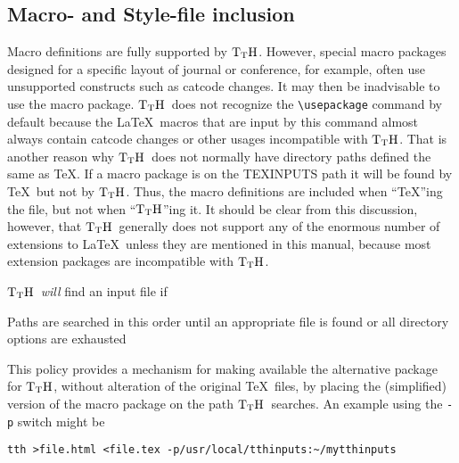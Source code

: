 \documentclass[12pt]{article}
\def\TtH{$\rm{}T_TH$}
\begin{document}
\subsection{Macro- and Style-file 
inclusion }
\label{texins}
Macro definitions are fully supported by \TtH. However, special macro
packages designed for a specific layout of journal or conference, for
example, often use unsupported constructs such as catcode changes. It
may then be inadvisable to use the macro package.  \TtH\ does not
recognize the \verb!\usepackage! command by default because the
\LaTeX\ macros that are input by this command almost always contain
catcode changes or other usages incompatible with \TtH. That is
another reason why \TtH\ does not normally have directory paths
defined the same as \TeX. If a macro package is on the TEXINPUTS path
it will be found by \TeX\ but not by \TtH.  Thus, the macro
definitions are included when ``\TeX''ing the file, but not when
``\TtH''ing it.  It should be clear from this discussion, however,
that \TtH\ generally does not support any of the enormous number of
extensions to \LaTeX\ unless they are mentioned in this manual,
because most extension packages are incompatible with \TtH.

\TtH\ \emph{will} find an input file if 
Paths are searched in this order until an appropriate file is
found or all directory options are exhausted

 This policy provides a mechanism
for making available the alternative package for \TtH,
without alteration of the original \TeX\ files, by placing the
(simplified) version of the macro package on the path \TtH\ searches.
 An example using the \verb!-p! switch might be
\begin{verbatim}
tth >file.html <file.tex -p/usr/local/tthinputs:~/mytthinputs
\end{verbatim}
\end{document}
